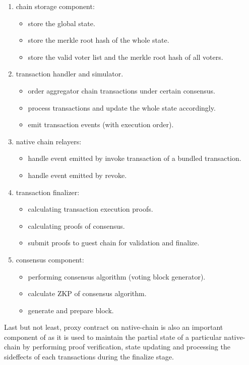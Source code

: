 \documentclass[acmtog, natbib=false]{acmart}
\begin{document}
\begin{enumerate}[leftmargin=*]
\item chain storage component:
    \begin{itemize}
    \item store the global state.
    \item store the merkle root hash of the whole state.
    \item store the valid voter list and the merkle root hash of all voters.
    \end{itemize}
\item transaction handler and simulator.
    \begin{itemize}
    \item order aggregator chain transactions under certain consensus.
    \item process transactions and update the whole state accordingly.
    \item emit transaction events (with execution order).
    \end{itemize}
\item native chain relayers:
    \begin{itemize}
    \item handle event emitted by invoke transaction of a bundled transaction.
    \item handle event emitted by revoke.
    \end{itemize}
\item transaction finalizer:
    \begin{itemize}
    \item calculating transaction execution proofs.
    \item calculating proofs of consensus.
    \item submit proofs to guest chain for validation and finalize.
    \end{itemize}
\item consensus component:
    \begin{itemize}
    \item performing consensus algorithm (voting block generator).
    \item calculate ZKP of consensus algorithm.
    \item generate and prepare block.
    \end{itemize}
\end{enumerate}

Last but not least, proxy contract on native-chain is also an important component of \dprotocol as it is used to maintain the partial state of a particular native-chain by performing proof verification, state updating and processing the sideffects of each transactions during the finalize stage.  
\end{document}

